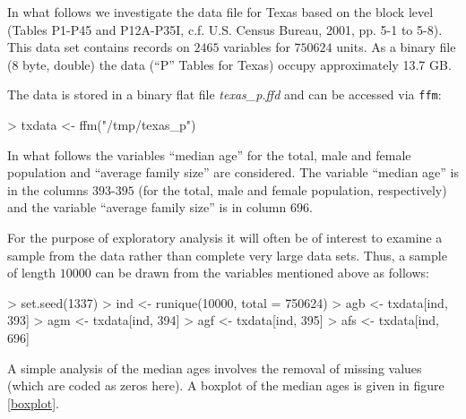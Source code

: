 \documentclass[12pt,a4paper]{article}
\begin{document}
In what follows we investigate the data file for Texas based on the block level (Tables P1-P45 and P12A-P35I, c.f. U.S. Census Bureau, 2001, pp. 5-1 to 5-8). 
This data set contains records on $2465$ variables for $750624$ units. 
As a binary file (8 byte, double) the data (``P'' Tables for Texas) occupy approximately 13.7 GB. 

The data is stored in a binary flat file \textsl{texas\_p.ffd} and can be accessed via \texttt{ffm}:

\begin{Schunk}
\begin{Sinput}
> txdata <- ffm("/tmp/texas_p")
\end{Sinput}
\end{Schunk}

In what follows the variables ``median age'' for the total, male and female population and ``average family size'' are considered. 
The variable ``median age'' is in the columns $393$-$395$ (for the total, male and female population, respectively) and the variable ``average family size'' is in column $696$. 

For the purpose of exploratory analysis it will often be of interest to examine a sample from the data rather than complete very large data sets. 
Thus, a sample of length $10000$ can be drawn from the variables mentioned above as follows:

\begin{Schunk}
\begin{Sinput}
> set.seed(1337)
> ind <- runique(10000, total = 750624)
> agb <- txdata[ind, 393]
> agm <- txdata[ind, 394]
> agf <- txdata[ind, 395]
> afs <- txdata[ind, 696]
\end{Sinput}
\end{Schunk}

A simple analysis of the median ages involves the removal of missing values (which are coded as zeros here). 
A boxplot of the median ages is given in figure \ref{boxplot}.
\end{document}
